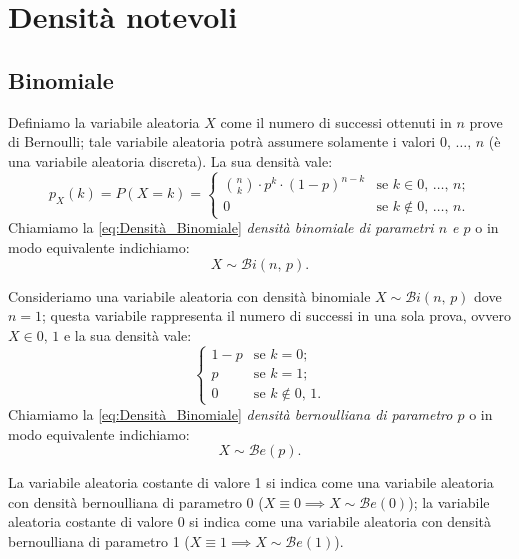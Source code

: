     \section{Densità notevoli}
        \subsection{Binomiale}
            \begin{defn}\label{defn:Densità_Binomiale}
                Definiamo la variabile aleatoria $X$ come il numero di successi ottenuti in $n$ prove di Bernoulli; tale variabile aleatoria potrà assumere solamente i valori $0,\, \ldots,\, n$ (è una variabile aleatoria discreta).
                La sua densità vale:
                \begin{equation}\label{eq:Densità_Binomiale}
                    p_X(k) = P(X = k) = \begin{cases}
                        \binom{n}{k}\cdot p^k\cdot (1-p)^{n-k} & \text{se $k \in {0,\, \ldots,\, n}$;}\\
                        0 & \text{se $k \notin {0,\, \ldots,\, n}$.}
                    \end{cases}
                \end{equation}
                Chiamiamo la \eqref{eq:Densità_Binomiale} \textit{densità binomiale di parametri $n$ e $p$} o in modo equivalente indichiamo: \[
                    X \sim \mathcal{B}i(n,\,p)
                .\]
            \end{defn}
            \begin{defn}\label{defn:Densità_Bernoulliana}
                Consideriamo una variabile aleatoria con densità binomiale $X \sim \mathcal{B}i(n,\,p)$ dove $n = 1$; questa variabile rappresenta il numero di successi in una sola prova, ovvero $X \in {0,\, 1}$ e la sua densità vale:
                \begin{equation}\label{eq:Densità_Bernoulliana}
                    \begin{cases}
                        1-p & \text{se $k=0$;} \\
                        p & \text{se $k=1$;} \\
                        0 & \text{se $k \notin {0,\, 1}$.}
                    \end{cases}
                \end{equation}
                Chiamiamo la \eqref{eq:Densità_Binomiale} \textit{densità bernoulliana di parametro $p$} o in modo equivalente indichiamo: \[
                    X \sim \mathcal{B}e(p)
                .\] 
            \end{defn}
            \begin{obsv}
                La variabile aleatoria costante di valore 1 si indica come una variabile aleatoria con densità bernoulliana di parametro 0 ($X \equiv 0 \implies X \sim \mathcal{B}e(0)$); la variabile aleatoria costante di valore 0 si indica come una variabile aleatoria con densità bernoulliana di parametro 1 ($X \equiv 1 \implies X \sim \mathcal{B}e(1)$).
            \end{obsv}
